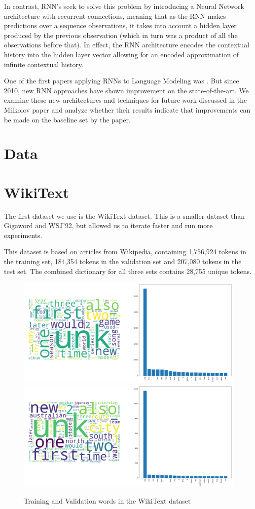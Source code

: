 \documentclass[a4paper]{article}
\begin{document}
In contrast, RNN's seek to solve this problem by introducing a Neural Network
architecture with recurrent connections, meaning that as the RNN makes predictions
over a sequence observations, it takes into account a hidden layer produced
by the previous observation (which in turn was a product of all the observations
before that). In effect, the RNN architecture encodes the contextual history
into the hidden layer vector allowing for an encoded approximation of infinite
contextual history.

One of the first papers applying RNNs to Language Modeling was \cite{Milkolov10}. But since 2010, new RNN approaches have shown
improvement on the state-of-the-art. We examine these new architectures and
techniques for future work discussed in the Milkolov paper and analyze whether their
results indicate that improvements can be made on the baseline set by the paper.

\section{Data}
\label{sec:data}

\section{WikiText}
\label{sec:wikitext}

The first dataset we use is the WikiText dataset. This is a smaller dataset than
Gigaword and WSJ'92, but allowed us to
iterate faster and run more experiments.

This dataset is based on articles from Wikipedia, containing 1,756,924 tokens in
the training set, 184,354 tokens in the validation set and 207,080 tokens
in the test set. The combined dictionary for all three sets contains 28,755
unique tokens.

\begin{figure}[!ht]
\includegraphics[width=0.7\columnwidth]{sr-eda-wikitext-train-words}
\includegraphics[width=0.7\columnwidth]{sr-eda-wikitext-valid-words}
\centering
\caption{Training and Validation words in the WikiText dataset}
\end{figure}
\end{document}
